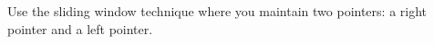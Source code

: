 \documentclass[preview]{standalone}
\begin{document}
Use the sliding window technique where you maintain two pointers: a right pointer and a left pointer.\\
\end{document}
